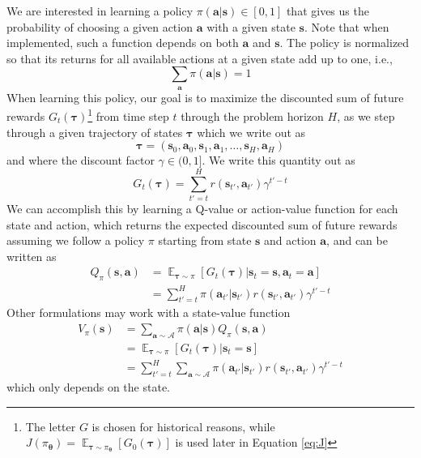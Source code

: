 \documentclass{article}
\begin{document}
We are interested in learning a policy $\pi(\mathbf{a}| \mathbf{s})\in [0,1]$ that gives us the probability of choosing a given action $\mathbf{a}$ with a given state $\mathbf{s}$. Note that when implemented, such a function depends on both $\mathbf{a}$ and $\mathbf{s}$. The policy is normalized so that its returns for all available actions at a given state add up to one, i.e., \begin{equation}\label{eq:normalization}
\sum_\mathbf{a}\pi(\mathbf{a}|\mathbf{s})=1
\end{equation} When learning this policy, our goal is to maximize the discounted sum of future rewards $G_t(\boldsymbol{\tau})$\footnote{The letter $G$ is chosen for historical reasons, while $J(\pi_{\boldsymbol{\theta}})=\mathop{\mathbb{E}}_{\boldsymbol{\tau}\sim\pi_{\boldsymbol{\theta}}}[G_0({\boldsymbol{\tau}})]$ is used later in Equation \ref{eq:J}} from time step $t$ through the problem horizon $H$, as we step through a given trajectory of states $\boldsymbol{\tau}$ which we write out as
\begin{equation}
\boldsymbol{\tau}=(\mathbf{s}_0,\mathbf{a}_0,\mathbf{s}_1,\mathbf{a}_1,\dots,\mathbf{s}_H,\mathbf{a}_H)
\end{equation} and where the discount factor $\gamma\in(0,1]$. We write this quantity out as
\begin{equation}
    G_t(\boldsymbol{\tau})=\sum_{t'=t}^{H}r(\mathbf{s}_{t'},\mathbf{a}_{t'})\gamma^{t'-t}
\end{equation}
We can accomplish this by learning a Q-value or action-value function for each state and action, which returns the expected discounted sum of future rewards assuming we follow a policy $\pi$ starting from state $\mathbf{s}$ and action $\mathbf{a}$, and can be written as
\begin{equation}
\begin{split}
Q_\pi(\mathbf{s},\mathbf{a})&=\mathop{\mathbb{E}}_{\boldsymbol{\tau}\sim\pi}[G_t({\boldsymbol{\tau}})|\mathbf{s}_t=\mathbf{s},\mathbf{a}_t=\mathbf{a}]\\&=\sum_{t'=t}^{H}\pi(\mathbf{a}_{t'}|\mathbf{s}_{t'})r(\mathbf{s}_{t'},\mathbf{a}_{t'})\gamma^{t'-t}
\end{split}
\end{equation} Other formulations may work with a state-value function \begin{equation}\begin{split}V_{\pi}(\mathbf{s})&=\sum_{\mathbf{a}\sim\mathcal{A}}\pi(\mathbf{a}|\mathbf{s})Q_\pi(\mathbf{s},\mathbf{a})\\&=\mathop{\mathbb{E}}_{\boldsymbol{\tau}\sim\pi}[G_t({\boldsymbol{\tau}})|\mathbf{s}_t=\mathbf{s}]\\&=\sum_{t'=t}^{H}\sum_{\mathbf{a}\sim\mathcal{A}}\pi(\mathbf{a}_{t'}|\mathbf{s}_{t'})r(\mathbf{s}_{t'},\mathbf{a}_{t'})\gamma^{t'-t}\end{split}\end{equation}which only depends on the state.
\end{document}

